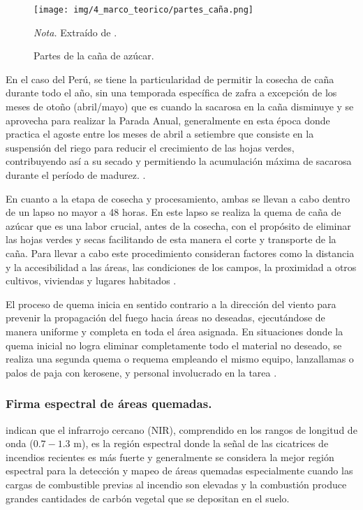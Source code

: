 \begin{figure}[H]
    \centering
    \caption{Partes de la caña de azúcar.}
    \texttt{[image: img/4\_marco\_teorico/partes\_caña.png]}
    \label{fig:quema_cana}
    \begin{flushleft}
        \textit{Nota.} Extraído de \citet{pipicano_alisis_2022}. 
        \vspace{-\baselineskip}
    \end{flushleft}
\end{figure}
En el caso del Perú, se tiene la particularidad de permitir la cosecha de caña durante todo el año, 
sin una temporada específica de zafra a excepción de los meses de otoño (abril/mayo) que es cuando la sacarosa en la caña disminuye y se aprovecha
para realizar la Parada Anual, generalmente  en esta época donde practica el agoste entre los meses de abril a setiembre que consiste en la suspensión 
del riego para reducir el crecimiento de las hojas verdes, contribuyendo así a su secado y permitiendo la acumulación máxima de sacarosa durante el período de madurez.
\citep{helfgott_cultivo_2016}.

En cuanto a la etapa de cosecha y procesamiento, ambas se llevan a cabo dentro de un lapso no mayor a 48 horas. En este lapso se realiza la quema de caña de azúcar que es una labor crucial, antes de la cosecha, con el propósito de eliminar las hojas verdes y secas facilitando de esta manera el corte y transporte de la caña. 
Para llevar a cabo este procedimiento consideran factores como la distancia y la accesibilidad a las áreas, las condiciones 
de los campos, la proximidad a otros cultivos, viviendas y lugares habitados \citep[pp. 1530 - 1536]{casa_grande_saa_2018}. 

El proceso de quema inicia en sentido contrario a la dirección del viento para prevenir la propagación del fuego hacia áreas no deseadas, ejecutándose de manera uniforme y completa en toda el área asignada. 
En situaciones donde la quema inicial no logra eliminar completamente todo el material no deseado, se realiza una segunda quema o requema empleando el mismo equipo, lanzallamas o palos de paja con kerosene, 
y personal involucrado en la tarea \citep[pp. 434 - 436]{san_jacinto_2014}.

\subsubsection{Firma espectral de áreas quemadas.}
\citet{Pereira1999} indican que el infrarrojo cercano (NIR), comprendido en los rangos de longitud de onda ($0.7 - 1.3$ \mu m), es la región espectral donde la señal de las cicatrices de incendios recientes es más fuerte y generalmente se considera la mejor región espectral para la detección y mapeo de áreas quemadas especialmente cuando las 
cargas de combustible previas al incendio son elevadas y la combustión produce grandes cantidades de carbón vegetal que se depositan en el suelo. 

